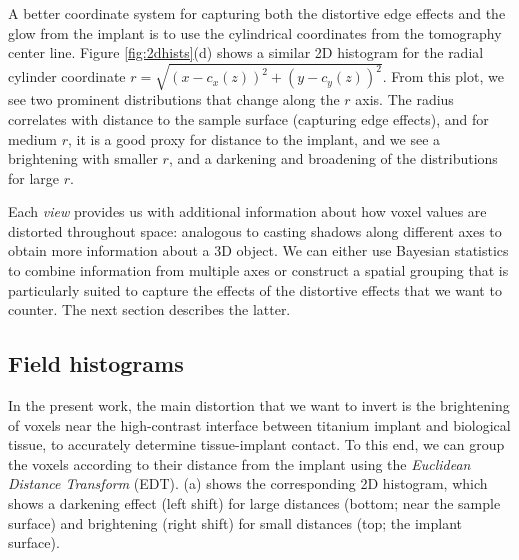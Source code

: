 A better coordinate system for capturing both the distortive edge effects and
the glow from the implant is to use the cylindrical coordinates from the
tomography center line. Figure \ref{fig:2dhists}(d) shows a similar 2D
histogram for the radial cylinder coordinate $r=\sqrt{\left(
x-c_x(z)\right)^2+\left( y-c_y(z)\right)^2}$. From this plot, we see two
prominent distributions that change along the $r$ axis. The radius correlates
with distance to the sample surface (capturing edge effects), and for medium
$r$, it is a good proxy for distance to the implant, and we see a brightening
with smaller $r$, and a darkening and broadening of the distributions for large
$r$.

Each \textit{view} provides us with additional information about how voxel
values are distorted throughout space: analogous to casting shadows along
different axes to obtain more information about a 3D object. We can either use
Bayesian statistics to combine information from multiple axes or construct a
spatial grouping that is particularly suited to capture the effects of the
distortive effects that we want to counter. The next section describes the
latter.

\subsection{Field histograms}

In the present work, the main distortion that we want to invert is the
brightening of voxels near the high-contrast interface between titanium implant
and biological tissue, to accurately determine tissue-implant contact. To this
end, we can group the voxels according to their distance from the implant using
the \textit{Euclidean Distance Transform} (EDT). (a) shows
the corresponding 2D histogram, which shows a darkening effect (left shift) for
large distances (bottom; near the sample surface) and brightening (right shift)
for small distances (top; the implant surface).

